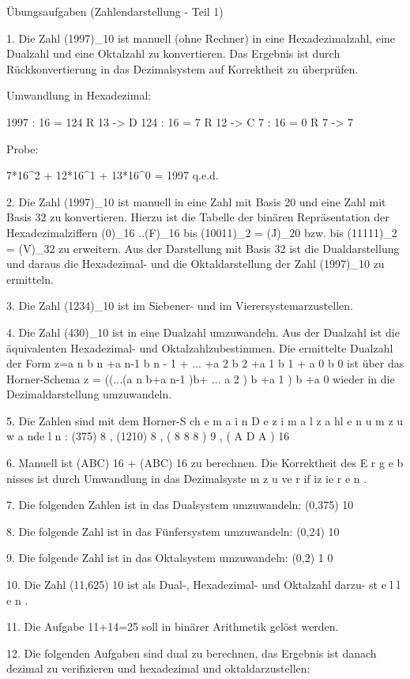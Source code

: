 Übungsaufgaben (Zahlendarstellung - Teil 1)

1. Die Zahl (1997)_10 ist manuell (ohne Rechner) in eine Hexadezimalzahl, eine Dualzahl und eine Oktalzahl zu konvertieren. Das Ergebnis ist durch Rückkonvertierung in das Dezimalsystem auf Korrektheit zu überprüfen.

Umwandlung in Hexadezimal:

    1997 : 16 = 124 R 13 -> D
     124 : 16 =   7 R 12 -> C
       7 : 16 =   0 R  7 -> 7

Probe:

    7*16^2 + 12*16^1 + 13*16^0 = 1997 q.e.d.

2. Die Zahl (1997)_10 ist manuell in eine Zahl mit Basis 20 und eine Zahl mit Basis 32 zu konvertieren. Hierzu ist die Tabelle der binären Repräsentation der Hexadezimalziffern (0)_16 ..(F)_16 bis (10011)_2 = (J)_20 bzw. bis (11111)_2 = (V)_32 zu erweitern. Aus der Darstellung mit Basis 32 ist die Dualdarstellung und daraus die Hexadezimal- und die Oktaldarstellung der Zahl (1997)_10 zu ermitteln.

3. Die Zahl (1234)_10 ist im Siebener- und im Vierersystemarzustellen.

4. Die Zahl (430)_10 ist in eine Dualzahl umzuwandeln. Aus der Dualzahl ist die äquivalenten Hexadezimal- und Oktalzahlzubestimmen. Die ermittelte Dualzahl der Form z=a n b n +a n-1 b n - 1 + ... +a 2 b 2 +a 1 b 1 + a 0 b 0 ist über das Horner-Schema z = ((...(a n b+a n-1 )b+ ... a 2 ) b +a 1 ) b +a 0 wieder in die Dezimaldarstellung umzuwandeln.

5. Die Zahlen sind mit dem Horner-S ch e m a i n D e z i m a l z a hl e n u m z u w a nde l n : (375) 8 , (1210) 8 , ( 8 8 8 ) 9 , ( A D A ) 16

6. Manuell ist (ABC) 16 + (ABC) 16 zu berechnen. Die Korrektheit des E r g e b nisses ist durch Umwandlung in das Dezimalsyste m z u ve r if iz ie r e n .

7. Die folgenden Zahlen ist in das Dualsystem umzuwandeln: (0,375) 10

8. Die folgende Zahl ist in das Fünfersystem umzuwandeln: (0,24) 10

9. Die folgende Zahl ist in das Oktalsystem umzuwandeln: (0,2) 1 0

10. Die Zahl (11,625) 10 ist als Dual-, Hexadezimal- und Oktalzahl darzu- st e l l e n .

11. Die Aufgabe 11+14=25 soll in binärer Arithmetik gelöst werden.

12. Die folgenden Aufgaben sind dual zu berechnen, das Ergebnis ist danach dezimal zu verifizieren und hexadezimal und oktaldarzustellen:

